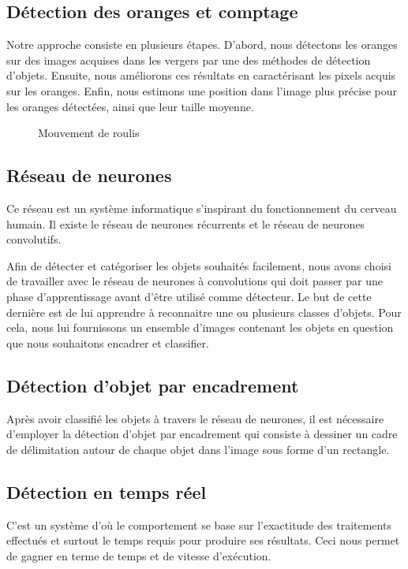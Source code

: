 \subsection{Détection des oranges et comptage}
Notre approche consiste en plusieurs étapes. D'abord, nous détectons les oranges sur des images acquises dans les vergers par une des méthodes de détection d’objets. Ensuite, nous améliorons ces résultats en caractérisant les pixels acquis sur les oranges. Enfin, nous estimons une position  dans l’image plus précise pour les oranges détectées, ainsi que leur taille moyenne.
	\begin{figure} [H]
	\begin{center}
		\caption{Mouvement de roulis}
	\end{center}
\end{figure}

\subsection{Réseau de neurones}
Ce réseau est un système informatique s'inspirant du fonctionnement du cerveau humain. Il existe le réseau de neurones récurrents et le réseau de neurones convolutifs\cite{Lebigdata}.

Afin de détecter et catégoriser les objets souhaités facilement, nous avons choisi de travailler avec le réseau de neurones à convolutions qui doit passer par une phase d’apprentissage avant d’être utilisé comme détecteur. Le but de cette dernière est de lui apprendre à reconnaitre une ou plusieurs classes d’objets. Pour cela, nous lui fournissons un ensemble d’images contenant les objets en question que nous souhaitons encadrer et classifier.
\subsection{Détection d'objet par encadrement}
Après avoir classifié les objets à travers le réseau de neurones, il est nécessaire d'employer la détection d'objet par encadrement qui consiste à dessiner un cadre de délimitation autour de chaque objet dans l’image sous forme d'un rectangle.
\subsection{Détection en temps réel}
C'est un système d'où le comportement se base sur l'exactitude des traitements effectués et surtout le temps requis pour produire ses résultats. Ceci nous permet de gagner en terme de temps et de vitesse d'exécution.
